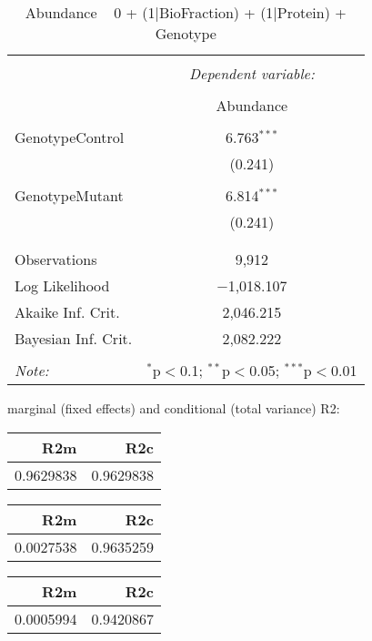 \documentclass[11pt]{report}
\begin{document}
\begin{table}[!htbp] \centering 
  \caption{Abundance ~ 0 + (1|BioFraction) + (1|Protein) + Genotype} 
  \label{} 
\begin{tabular}{@{\extracolsep{5pt}}lc} 
\\[-1.8ex]\hline 
\hline \\[-1.8ex] 
 & \multicolumn{1}{c}{\textit{Dependent variable:}} \\ 
\cline{2-2} 
\\[-1.8ex] & Abundance \\ 
\hline \\[-1.8ex] 
 GenotypeControl & 6.763$^{***}$ \\ 
  & (0.241) \\ 
  & \\ 
 GenotypeMutant & 6.814$^{***}$ \\ 
  & (0.241) \\ 
  & \\ 
\hline \\[-1.8ex] 
Observations & 9,912 \\ 
Log Likelihood & $-$1,018.107 \\ 
Akaike Inf. Crit. & 2,046.215 \\ 
Bayesian Inf. Crit. & 2,082.222 \\ 
\hline 
\hline \\[-1.8ex] 
\textit{Note:}  & \multicolumn{1}{r}{$^{*}$p$<$0.1; $^{**}$p$<$0.05; $^{***}$p$<$0.01} \\ 
\end{tabular} 
\end{table} 
marginal (fixed effects) and conditional (total variance) R2:

\begin{tabular}{r|r}
\hline
R2m & R2c\\
\hline
0.9629838 & 0.9629838\\
\hline
\end{tabular}

\begin{tabular}{r|r}
\hline
R2m & R2c\\
\hline
0.0027538 & 0.9635259\\
\hline
\end{tabular}

\begin{tabular}{r|r}
\hline
R2m & R2c\\
\hline
0.0005994 & 0.9420867\\
\hline
\end{tabular}
\end{document}
